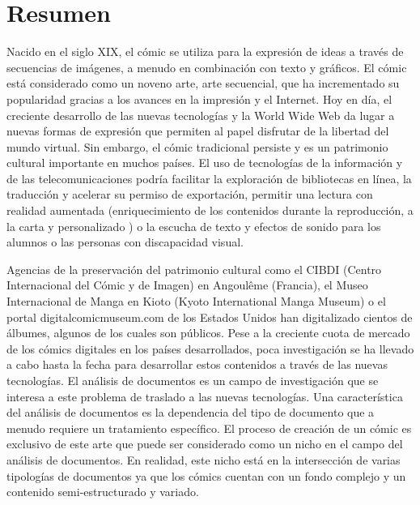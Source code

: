 \chapter*{Resumen}

Nacido en el siglo XIX, el cómic se utiliza para la expresión de ideas a través de secuencias de imágenes, a menudo en combinación con texto y gráficos. 
El cómic está considerado como un noveno arte, arte secuencial, que ha incrementado su popularidad gracias a los avances en la impresión y el Internet.
Hoy en día, el creciente desarrollo de las nuevas tecnologías y la World Wide Web da lugar a nuevas formas de expresión que permiten al papel disfrutar de la libertad del mundo virtual.
Sin embargo, el cómic tradicional persiste y es un patrimonio cultural importante en muchos países.
El uso de tecnologías de la información y de las telecomunicaciones podría facilitar la exploración de bibliotecas en línea, la traducción y acelerar su permiso de exportación, permitir una lectura con realidad aumentada (enriquecimiento de los contenidos durante la reproducción, a la carta y personalizado ) o la escucha de texto y efectos de sonido para los alumnos o las personas con discapacidad visual.

Agencias de la preservación del patrimonio cultural como el CIBDI (Centro Internacional del Cómic y de Imagen) en Angoulême (Francia), el Museo Internacional de Manga en Kioto (Kyoto International Manga Museum) o el portal digitalcomicmuseum.com de los Estados Unidos han digitalizado cientos de álbumes, algunos de los cuales son públicos.
Pese a la creciente cuota de mercado de los cómics digitales en los países desarrollados, poca investigación se ha llevado a cabo hasta la fecha para desarrollar estos contenidos a través de las nuevas tecnologías.
El análisis de documentos es un campo de investigación que se interesa a este problema de traslado a las nuevas tecnologías. Una característica del análisis de documentos es la dependencia del tipo de documento que a menudo requiere un tratamiento específico.
El proceso de creación de un cómic es exclusivo de este arte que puede ser considerado como un nicho en el campo del análisis de documentos.
En realidad, este nicho está en la intersección de varias tipologías de documentos ya que los cómics cuentan con un fondo complejo y un contenido semi-estructurado y variado.

